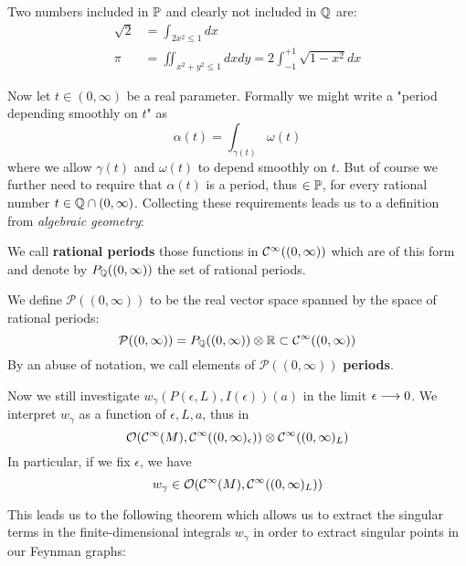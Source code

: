 \begin{example}
  Two numbers included in $\mathbb{P}$ and clearly not included in $\mathbb{Q}$ are:
  \begin{align}
    \sqrt{2} &= \int_{2x^2 \leq 1} dx \\
    \pi &= \iint_{x^2+y^2\leq 1} dx dy = 2 \int_{-1}^{+1} \sqrt{1-x^2} dx
  \end{align}
\end{example}

Now let $t \in (0, \infty)$ be a real parameter. Formally we might write a "period depending smoothly on $t$" as
\begin{equation} \alpha(t) = \int_{\gamma(t)} \omega(t)\end{equation}
where we allow $\gamma(t)$ and $\omega(t)$ to depend smoothly on $t$. But of course we further need to require that $\alpha(t)$ is a period, thus $\in \mathbb{P}$, for every rational number $t \in \mathbb{Q} \cap (0,\infty)$. Collecting these requirements leads us to a definition from \emph{algebraic geometry}:

\begin{definition}
  We call \textbf{rational periods} those functions in $\mathcal{C}^{\infty}((0,\infty))$ which are of this form and denote by $P_{\mathbb{Q}}((0,\infty))$ the set of rational periods.
\end{definition}

\begin{definition}
  We define $\mathcal{P}((0,\infty))$ to be the real vector space spanned by the space of rational periods:
  \begin{equation}\mathcal{P}((0,\infty)) = P_{\mathbb{Q}}((0,\infty)) \otimes \mathbb{R} \subset \mathcal{C}^{\infty}((0,\infty))\end{equation}
  By an abuse of notation, we call elements of $\mathcal{P}((0,\infty))$ \textbf{periods}.
\end{definition}

Now we still investigate $w_\gamma(P(\epsilon,L), I(\epsilon))(a)$ in the limit $\epsilon \lra 0$. We interpret $w_\gamma$ as a function of $\epsilon,L,a$, thus in
\begin{equation} \OO(\Ci(M), \Ci((0,\infty)_\epsilon)) \otimes \Ci((0,\infty)_L)\end{equation}
In particular, if we fix $\epsilon$, we have
\begin{equation} w_\gamma \in \mathcal{O}(\mathcal{C}^{\infty}(M), \mathcal{C}^{\infty}((0,\infty)_L))\end{equation}

This leads us to the following theorem which allows us to extract the singular terms in the finite-dimensional integrals $w_\gamma$ in order to extract singular points in our Feynman graphs:

